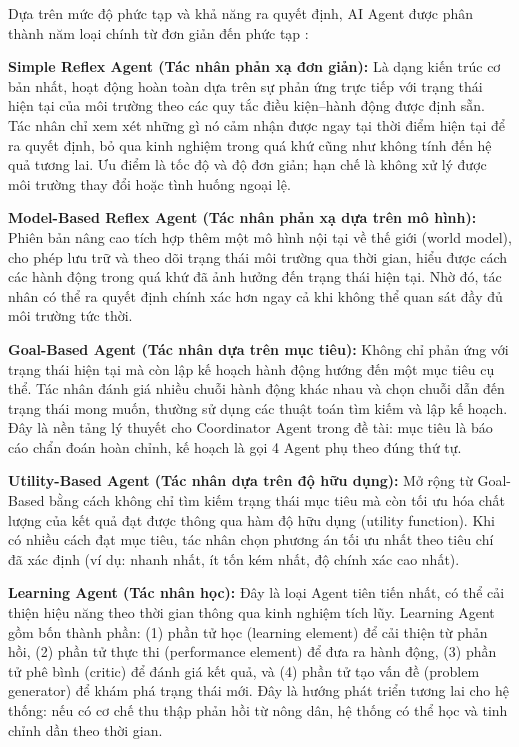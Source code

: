 Dựa trên mức độ phức tạp và khả năng ra quyết định, AI Agent được phân thành năm loại chính từ đơn giản đến phức tạp \cite{sumers2023}:

\textbf{Simple Reflex Agent (Tác nhân phản xạ đơn giản):} Là dạng kiến trúc cơ bản nhất, hoạt động hoàn toàn dựa trên sự phản ứng trực tiếp với trạng thái hiện tại của môi trường theo các quy tắc điều kiện--hành động được định sẵn. Tác nhân chỉ xem xét những gì nó cảm nhận được ngay tại thời điểm hiện tại để ra quyết định, bỏ qua kinh nghiệm trong quá khứ cũng như không tính đến hệ quả tương lai. Ưu điểm là tốc độ và độ đơn giản; hạn chế là không xử lý được môi trường thay đổi hoặc tình huống ngoại lệ.

\textbf{Model-Based Reflex Agent (Tác nhân phản xạ dựa trên mô hình):} Phiên bản nâng cao tích hợp thêm một mô hình nội tại về thế giới (world model), cho phép lưu trữ và theo dõi trạng thái môi trường qua thời gian, hiểu được cách các hành động trong quá khứ đã ảnh hưởng đến trạng thái hiện tại. Nhờ đó, tác nhân có thể ra quyết định chính xác hơn ngay cả khi không thể quan sát đầy đủ môi trường tức thời.

\textbf{Goal-Based Agent (Tác nhân dựa trên mục tiêu):} Không chỉ phản ứng với trạng thái hiện tại mà còn lập kế hoạch hành động hướng đến một mục tiêu cụ thể. Tác nhân đánh giá nhiều chuỗi hành động khác nhau và chọn chuỗi dẫn đến trạng thái mong muốn, thường sử dụng các thuật toán tìm kiếm và lập kế hoạch. Đây là nền tảng lý thuyết cho Coordinator Agent trong đề tài: mục tiêu là báo cáo chẩn đoán hoàn chỉnh, kế hoạch là gọi 4 Agent phụ theo đúng thứ tự.

\textbf{Utility-Based Agent (Tác nhân dựa trên độ hữu dụng):} Mở rộng từ Goal-Based bằng cách không chỉ tìm kiếm trạng thái mục tiêu mà còn tối ưu hóa chất lượng của kết quả đạt được thông qua hàm độ hữu dụng (utility function). Khi có nhiều cách đạt mục tiêu, tác nhân chọn phương án tối ưu nhất theo tiêu chí đã xác định (ví dụ: nhanh nhất, ít tốn kém nhất, độ chính xác cao nhất).

\textbf{Learning Agent (Tác nhân học):} Đây là loại Agent tiên tiến nhất, có thể cải thiện hiệu năng theo thời gian thông qua kinh nghiệm tích lũy. Learning Agent gồm bốn thành phần: (1) phần tử học (learning element) để cải thiện từ phản hồi, (2) phần tử thực thi (performance element) để đưa ra hành động, (3) phần tử phê bình (critic) để đánh giá kết quả, và (4) phần tử tạo vấn đề (problem generator) để khám phá trạng thái mới. Đây là hướng phát triển tương lai cho hệ thống: nếu có cơ chế thu thập phản hồi từ nông dân, hệ thống có thể học và tinh chỉnh dần theo thời gian.

